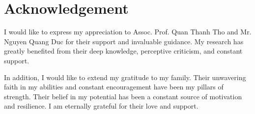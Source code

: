 \section*{\Huge Acknowledgement}
I would like to express my appreciation to Assoc. Prof. Quan Thanh Tho and Mr. Nguyen Quang Duc for their support and invaluable guidance. My research has greatly benefited from their deep knowledge, perceptive criticism, and constant support.

In addition, I would like to extend my gratitude to my family. Their unwavering faith in my abilities and constant encouragement have been my pillars of strength. Their belief in my potential has been a constant source of motivation and resilience. I am eternally grateful for their love and support.